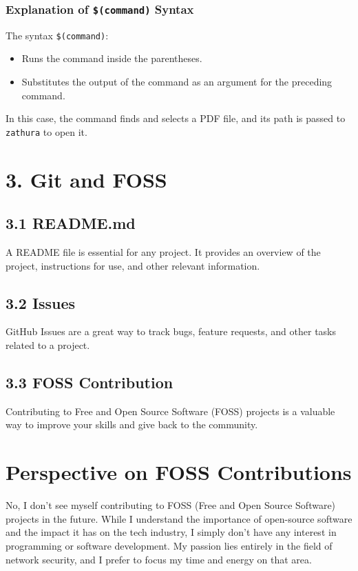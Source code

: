 \documentclass[12pt]{article}
\begin{document}
\subsubsection*{Explanation of \texttt{\$(command)} Syntax}
The syntax \texttt{\$(command)}:
\begin{itemize}
    \item Runs the command inside the parentheses.
    \item Substitutes the output of the command as an argument for the preceding command.
\end{itemize}
In this case, the command finds and selects a PDF file, and its path is passed to \texttt{zathura} to open it.

\section*{3. Git and FOSS}

\subsection*{3.1 README.md}
A README file is essential for any project. It provides an overview of the project, instructions for use, and other relevant information.

\subsection*{3.2 Issues}
GitHub Issues are a great way to track bugs, feature requests, and other tasks related to a project.

\subsection*{3.3 FOSS Contribution}
Contributing to Free and Open Source Software (FOSS) projects is a valuable way to improve your skills and give back to the community.

\section*{Perspective on FOSS Contributions}
No, I don’t see myself contributing to FOSS (Free and Open Source Software) projects in the future. While I understand the importance of open-source software and the impact it has on the tech industry, I simply don’t have any interest in programming or software development. My passion lies entirely in the field of network security, and I prefer to focus my time and energy on that area.
\end{document}
